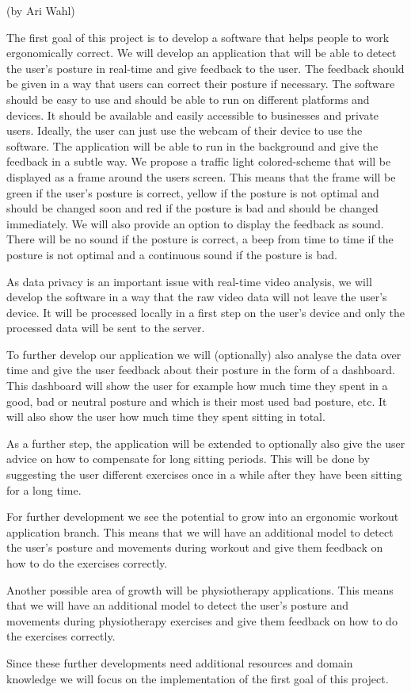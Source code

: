 (by Ari Wahl)

The first goal of this project is to develop a software that helps people to work
ergonomically correct. We will develop an application that will be able to detect the user's posture in real-time
and give feedback to the user. The feedback should be given in a way that users
can correct their posture if necessary. The software should be easy to use and should be able to run on 
different platforms and devices. It should be available and easily accessible to businesses and private users. Ideally, the user
can just use the webcam of their device to use the software. The application will be able to run in the background
and give the feedback in a subtle way. We propose a traffic light colored-scheme that will be displayed as a frame
around the users screen. This means that the frame will be green if the user's posture is correct, yellow if the posture is not optimal 
and should be changed soon and red if the posture is bad and should be changed immediately. 
We will also provide an option to display the feedback as sound. There will be no sound if the posture is correct, a
beep from time to time if the posture is not optimal and a continuous sound if the posture is bad.

As data privacy is an important issue with real-time video analysis, we will develop the software in a way that the raw video data
will not leave the user's device. It will be processed locally in a first step on the user's device and only the processed data will be sent to the server.

To further develop our application we will (optionally) also analyse the data over time and give the user feedback about their posture 
in the form of a dashboard. This dashboard will show the user for example how much time they spent in a good, bad or neutral posture
and which is their most used bad posture, etc. It will also show the user how much time they spent sitting in total. 

As a further step, the application will be extended to optionally also give the user advice on how to compensate for long sitting periods.
This will be done by suggesting the user different exercises once in a while after they have been sitting for a long time.  

For further development we see the potential to grow into an ergonomic workout application branch. This means that
we will have an additional model to detect the user's posture and movements during workout and give them feedback on how to do the exercises correctly.

Another possible area of growth will be physiotherapy applications. 
This means that we will have an additional model to detect the user's posture and movements
during physiotherapy exercises and give them feedback on how to do the exercises correctly.

Since these further developments need additional resources and domain knowledge we will focus on the implementation
of the first goal of this project. 